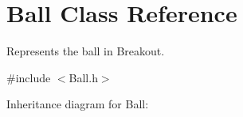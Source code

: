 \hypertarget{classBall}{}\section{Ball Class Reference}
\label{classBall}


Represents the ball in Breakout.  




{\ttfamily \#include $<$Ball.\+h$>$}



Inheritance diagram for Ball\+:
